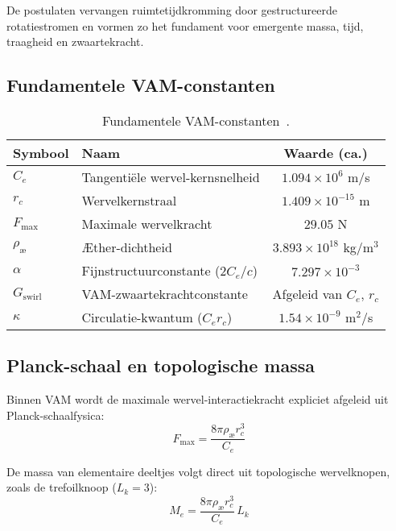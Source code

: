 De postulaten vervangen ruimtetijdkromming door gestructureerde rotatiestromen en vormen zo het fundament voor emergente massa, tijd, traagheid en zwaartekracht.

\subsection*{Fundamentele VAM-constanten}

\begin{table}[htbp]
    \centering
    \begin{tabular}{llc}
        \hline
        \toprule
        \textbf{Symbool} & \textbf{Naam} & \textbf{Waarde (ca.)} \\
        \hline
        \midrule
        $C_e$ & Tangentiële wervel-kernsnelheid & $1.094 \times 10^6$ m/s \\
        $r_c$ & Wervelkernstraal & $1.409 \times 10^{-15}$ m \\
        $F_{\text{max}}$ & Maximale wervelkracht & $29.05$ N \\
        $\rho_\text{\ae}$ & Æther-dichtheid & $3.893 \times 10^{18}$ kg/m$^3$ \\
        $\alpha$ & Fijnstructuurconstante ($2 C_e/c$) & $7.297 \times 10^{-3}$\\
        $G_{\text{swirl}}$ & VAM-zwaartekrachtconstante & Afgeleid van $C_e$, $r_c$\\
        $\kappa$ & Circulatie-kwantum ($C_e r_c$) & $1.54 \times 10^{-9}$ m$^2$/s \\
        \hline
        \bottomrule
    \end{tabular}
    \caption{Fundamentele VAM-constanten~\cite{vam2025field}.}
    \label{tab:VAMconstants}
\end{table}

\subsection*{Planck-schaal en topologische massa}

Binnen VAM wordt de maximale wervel-interactiekracht expliciet afgeleid uit Planck-schaalfysica:
\begin{equation}
    F_{\text{max}} = \frac{8\pi \rho_\text{\ae} r_c^3}{C_e}
\end{equation}


De massa van elementaire deeltjes volgt direct uit topologische wervelknopen, zoals de trefoilknoop ($L_k=3$):
\begin{equation}
    M_e = \frac{8\pi \rho_\text{\ae} r_c^3}{C_e}\, L_k
\end{equation}



